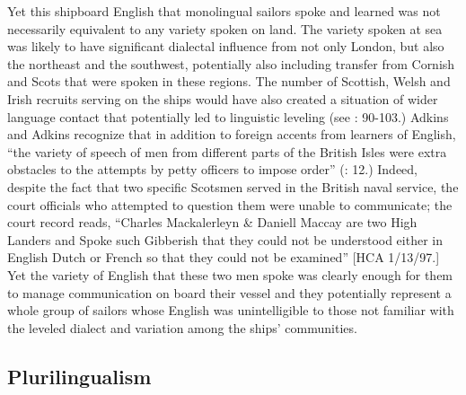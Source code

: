 Yet this shipboard English that monolingual sailors spoke and learned was not necessarily equivalent to any variety spoken on land. The variety spoken at sea was likely to have significant dialectal influence from not only London, but also the northeast and the southwest, potentially also including transfer from Cornish and Scots that were spoken in these regions. The number of Scottish, Welsh and Irish recruits serving on the ships would have also created a situation of wider language contact that potentially led to linguistic leveling (see \citealt{Trudgill1986}: 90-103.) Adkins and Adkins recognize that in addition to foreign accents from learners of English, “the variety of speech of men from different parts of the British Isles were extra obstacles to the attempts by petty officers to impose order” (\citealt{AdkinsAdkins2008}: 12.) Indeed, despite the fact that two specific Scotsmen served in the British naval service, the court officials who attempted to question them were unable to communicate; the court record reads, “Charles Mackalerleyn \& Daniell Maccay are two High Landers and Spoke such Gibberish that they could not be understood either in English Dutch or French so that they could not be examined” [HCA 1/13/97.] Yet the variety of English that these two men spoke was clearly enough for them to manage communication on board their vessel and they potentially represent a whole group of sailors whose English was unintelligible to those not familiar with the leveled dialect and variation among the ships’ communities. 

\subsection{{Plurilingualism}}%

